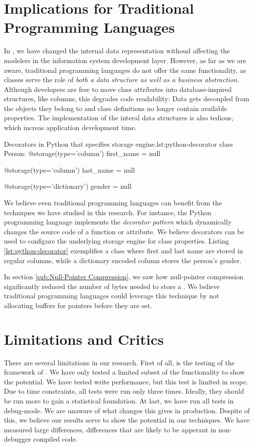 \section{Implications for Traditional Programming Languages}
\label{sec:Implications for Traditional Programming Languages}
In \mde, we have changed the internal data representation withoud affecting the modelers in the information system development layer. However, as far as we are aware, traditional programming languages do not offer the same functionality, as classes serve the role of \textit{both a data structure as well as a business abstraction}. Although developers are free to move class attributes into database-inspired structures, like columns, this degrades code readability: Data gets decoupled from the objects they belong to and class definitions no longer contain available properties. The implementation of the interal data structures is also tedious, which increas application development time.

\begin{pythoncode}{Decorators in Python that specifies storage engine.}{lst:python-decorator}
class Person:
    @storage(type='column')
    first_name = null

    @storage(type='column')
    last_name = null

    @storage(type='dictionary')
    gender = null
\end{pythoncode}
We believe even traditional programming languages can benefit from the techniques we have studied in this research. For instance, the Python programming language implements the \textit{decorator pattern} \cite{noauthor_undated-aq} which dynamically changes the source code of a function or attribute. We believe decorators can be used to configure the underlying storage engine for class properties. Listing \ref{lst:python-decorator} exemplifies a  class where first and last name are stored in regular columns, while a dictionary encoded column stores the person's gender.

In section \ref{sub:Null-Pointer Compression}, we saw how null-pointer compression significantly reduced the number of bytes needed to store a . We believe traditional programming languages could leverage this technique by not allocating buffers for pointers before they are set.


\section{Limitations and Critics}
\label{sec:Limitations and Critics}
There are several limitations in our research. First of all, is the testing of the framework of . We have only tested a limited subset of the functionality to show the potential. We have tested write performance, but this test is limited in scope. Due to time constraints, all tests were run only three times. Ideally, they should be run more to gain a statistical foundation. At last, we have run all tests in debug-mode. We are unaware of what changes this gives in production. Despite of this, we believe our results serve to show the potential in our techniques. We have measured large differences, differences that are likely to be apperant in non-debugger compiled code.

